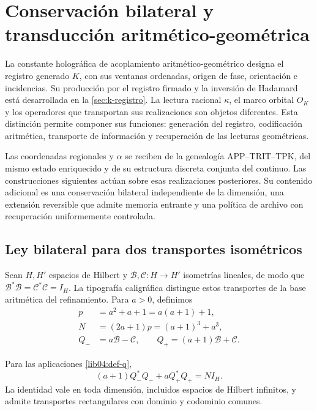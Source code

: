 \section{Conservación bilateral y transducción aritmético-geométrica}
\label{lib04:bilateral}

La constante holográfica de acoplamiento aritmético-geométrico designa
el registro generado \(K\), con sus ventanas ordenadas, origen de fase,
orientación e incidencias. Su producción por el registro firmado y la
inversión de Hadamard está desarrollada en la \cref{sec:k-registro}.
La lectura racional \(\kappa\), el marco orbital \(O_K\) y los
operadores que transportan sus realizaciones son objetos diferentes.
Esta distinción permite componer sus funciones: generación del registro,
codificación aritmética, transporte de información y recuperación de las
lecturas geométricas.

Las coordenadas regionales y \(\alpha\) se reciben de la genealogía
APP--TRIT--TPK, del mismo estado enriquecido y de su estructura discreta
conjunta del continuo. Las construcciones siguientes actúan sobre esas
realizaciones posteriores. Su contenido adicional es una conservación
bilateral independiente de la dimensión, una extensión reversible que
admite memoria entrante y una política de archivo con recuperación
uniformemente controlada.

\subsection{Ley bilateral para dos transportes isométricos}
\label{lib04:ley}

Sean \(H,H'\) espacios de Hilbert y
\(\mathcal B,\mathcal C:H\to H'\) isometrías lineales, de modo que
\(\mathcal B^*\mathcal B=\mathcal C^*\mathcal C=I_H\).
La tipografía caligráfica distingue estos transportes de la base
aritmética del refinamiento. Para \(a>0\), definimos
\begin{equation}
 \begin{aligned}
 p&=a^2+a+1=a(a+1)+1,\\
 N&=(2a+1)p=(a+1)^3+a^3,\\
 Q_-&=a\mathcal B-\mathcal C,\qquad
 Q_+=(a+1)\mathcal B+\mathcal C.
 \end{aligned}
 \label{lib04:def-q}
\end{equation}

\begin{theorem}
\label{lib04:teo-balance}
Para las aplicaciones \eqref{lib04:def-q},
\begin{equation}
 (a+1)Q_-^*Q_-+aQ_+^*Q_+=NI_H.
 \label{lib04:balance}
\end{equation}
La identidad vale en toda dimensión, incluidos espacios de Hilbert
infinitos, y admite transportes rectangulares con dominio y codominio
comunes.
\end{theorem}

